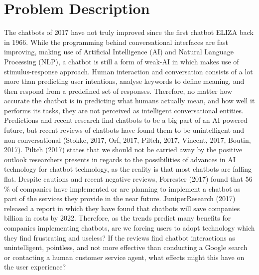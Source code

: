 \section{Problem Description}
The chatbots of 2017 have not truly improved since the first chatbot ELIZA back in 1966. While the programming behind conversational interfaces are fast improving, making use of Artificial Intelligence (AI) and Natural Language Processing (NLP), a chatbot is still a form of weak-AI in which makes use of stimulus-response approach. Human interaction and conversation consists of a lot more than predicting user intentions, analyse keywords to define meaning, and then respond from a predefined set of responses. Therefore, no matter how accurate the chatbot is in predicting what humans actually mean, and how well it performs its tasks, they are not perceived as intelligent conversational entities. Predictions and recent research find chatbots to be a big part of an AI powered future, but recent reviews of chatbots have found them to be unintelligent and non-conversational (Stokke, 2017, Orf, 2017, Piltch, 2017, Vincent, 2017, Boutin, 2017). Piltch (2017) states that we should not be carried away by the positive outlook researchers presents in regards to the possibilities of advances in AI technology for chatbot technology, as the reality is that most chatbots are falling flat. Despite cautions and recent negative reviews, Forrester (2017) found that 56 \% of companies have implemented or are planning to implement a chatbot as part of the services they provide in the near future. JuniperResearch (2017) released a report in which they have found that chatbots will save companies  billion in costs by 2022. Therefore, as the trends predict many benefits for companies implementing chatbots, are we forcing users to adopt technology which they find frustrating and useless? If the reviews find chatbot interactions as unintelligent, pointless, and not more effective than conducting a Google search or contacting a human customer service agent, what effects might this have on the user experience?

